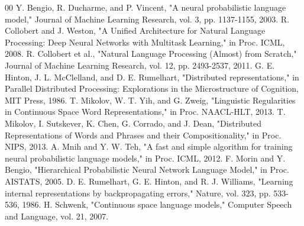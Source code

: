 \documentclass[conference]{IEEEtran}
\begin{document}
\begin{thebibliography}{00}
 Y. Bengio, R. Ducharme, and P. Vincent, "A neural probabilistic language model," Journal of Machine Learning Research, vol. 3, pp. 1137-1155, 2003.
 R. Collobert and J. Weston, "A Unified Architecture for Natural Language Processing: Deep Neural Networks with Multitask Learning," in Proc. ICML, 2008.
 R. Collobert et al., "Natural Language Processing (Almost) from Scratch," Journal of Machine Learning Research, vol. 12, pp. 2493-2537, 2011.
 G. E. Hinton, J. L. McClelland, and D. E. Rumelhart, "Distributed representations," in Parallel Distributed Processing: Explorations in the Microstructure of Cognition, MIT Press, 1986.
 T. Mikolov, W. T. Yih, and G. Zweig, "Linguistic Regularities in Continuous Space Word Representations," in Proc. NAACL-HLT, 2013.
 T. Mikolov, I. Sutskever, K. Chen, G. Corrado, and J. Dean, "Distributed Representations of Words and Phrases and their Compositionality," in Proc. NIPS, 2013.
 A. Mnih and Y. W. Teh, "A fast and simple algorithm for training neural probabilistic language models," in Proc. ICML, 2012.
 F. Morin and Y. Bengio, "Hierarchical Probabilistic Neural Network Language Model," in Proc. AISTATS, 2005.
 D. E. Rumelhart, G. E. Hinton, and R. J. Williams, "Learning internal representations by backpropagating errors," Nature, vol. 323, pp. 533-536, 1986.
 H. Schwenk, "Continuous space language models," Computer Speech and Language, vol. 21, 2007.
\end{thebibliography}
\end{document}
